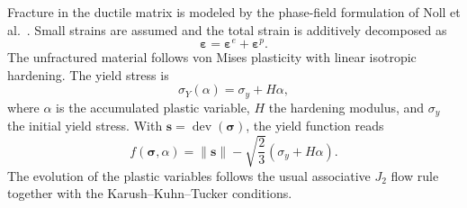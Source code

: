 \documentclass[pdflatex,sn-mathphys-num]{sn-jnl}
\begin{document}
Fracture in the ductile matrix is modeled by the phase-field formulation of Noll et al.~\cite{noll_3d_2020}. Small strains are assumed and the total strain is additively decomposed as
\begin{equation}
    \boldsymbol{\varepsilon} = \boldsymbol{\varepsilon}^e+\boldsymbol{\varepsilon}^p .
\end{equation}
The unfractured material follows von Mises plasticity with linear isotropic hardening. The yield stress is
\begin{equation}
    \sigma_Y(\alpha)=\sigma_y+H\alpha,
\end{equation}
where \(\alpha\) is the accumulated plastic variable, \(H\) the hardening modulus, and \(\sigma_y\) the initial yield stress. With \(\boldsymbol{s}=\operatorname{dev}(\boldsymbol{\sigma})\), the yield function reads
\begin{equation}
    f(\boldsymbol{\sigma},\alpha)=\|\boldsymbol{s}\|-\sqrt{\frac{2}{3}}\left(\sigma_y+H\alpha\right).
\end{equation}
The evolution of the plastic variables follows the usual associative \(J_2\) flow rule together with the Karush--Kuhn--Tucker conditions.
\end{document}
